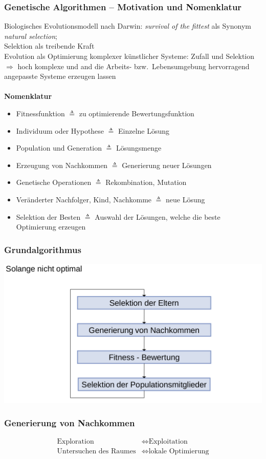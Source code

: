 \subsubsection{Genetische Algorithmen -- Motivation und Nomenklatur}
Biologisches Evolutionsmodell nach Darwin: \emph{survival of the fittest} als Synonym \emph{natural selection};\\
Selektion als treibende Kraft\\
Evolution als Optimierung komplexer künstlicher Systeme: Zufall und Selektion $\Rightarrow$ hoch komplexe und and die Arbeits- bzw.\ Lebensumgebung hervorragend angepasste Systeme erzeugen lassen \\\\
\textbf{Nomenklatur}
\begin{itemize}
	\item Fitnessfunktion $\triangleq$ zu optimierende Bewertungsfunktion
	\item Individuum oder Hypothese $\triangleq$ Einzelne Lösung
	\item Population und Generation $\triangleq$ Lösungsmenge
	\item Erzeugung von Nachkommen $\triangleq$ Generierung neuer Lösungen
	\item Genetische Operationen $\triangleq$ Rekombination, Mutation
	\item Veränderter Nachfolger, Kind, Nachkomme $\triangleq$ neue Lösung
	\item Selektion der Besten $\triangleq$ Auswahl der Lösungen, welche die beste Optimierung erzeugen
\end{itemize}

\subsubsection{Grundalgorithmus}
\includegraphics[width=.7\textwidth]{figures/grundalgorithmus.png}

\subsubsection{Generierung von Nachkommen}
\begin{align*}
	\text{Exploration} & \Leftrightarrow \text{Exploitation} \\
	\text{Untersuchen des Raumes} & \Leftrightarrow \text{lokale Optimierung}
\end{align*}

